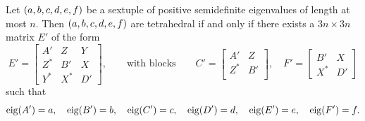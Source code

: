 \documentclass[notitlepage, 10pt]{article}
\begin{document}
\begin{cor}
    \label{cor:tetrahedral_block}
    Let $(a,b,c,d,e,f)$ be a sextuple of positive semidefinite eigenvalues of length at most $n$.
    Then $(a,b,c,d,e,f)$ are tetrahedral if and only if there exists a $3n \times 3n$ matrix $E'$ of the form
    \begin{equation}
        \label{eq:block_3by3}
        E' =
        \begin{bmatrix}
            A' & Z & Y \\
            Z^{*} & B' & X\\
            Y^{*} & X^{*} & D'
        \end{bmatrix},
        \qquad \text{with blocks} \qquad
        C' = \begin{bmatrix}
            A' & Z \\
            Z^{*} & B'\\
        \end{bmatrix}, \quad
        F' = \begin{bmatrix}
            B' & X \\
            X^{*} & D'
        \end{bmatrix}
    \end{equation}
    such that
    \begin{equation}
        \label{eq:block_eigenvalue_tet}
        \operatorname{eig}(A') = a, \quad
        \operatorname{eig}(B') = b, \quad
        \operatorname{eig}(C') = c, \quad
        \operatorname{eig}(D') = d, \quad
        \operatorname{eig}(E') = e, \quad
        \operatorname{eig}(F') = f.
    \end{equation}
\end{cor}
\end{document}
